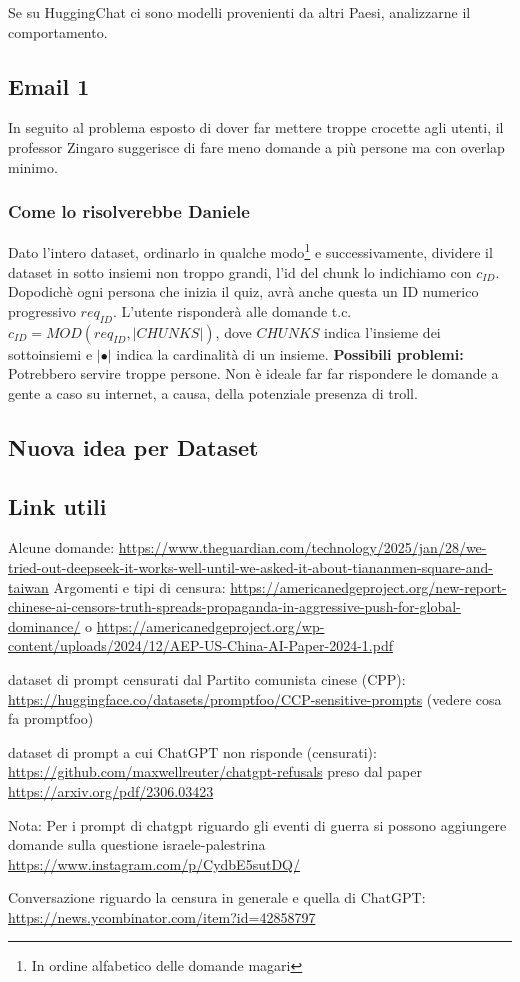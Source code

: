Se su HuggingChat ci sono modelli provenienti da altri Paesi, analizzarne il comportamento.

\subsection{Email 1}
In seguito al problema esposto di dover far mettere troppe crocette agli utenti, il professor Zingaro suggerisce di fare meno domande a più persone ma con overlap minimo.

\subsubsection{Come lo risolverebbe Daniele}
Dato l'intero dataset, ordinarlo in qualche modo\footnote{In ordine alfabetico delle domande magari} e successivamente, dividere il dataset in sotto insiemi non troppo grandi, l'id del chunk lo indichiamo con $c_{ID}$.
\newline
Dopodichè ogni persona che inizia il quiz, avrà anche questa un ID numerico progressivo $req_{ID}$.
\newline
L'utente risponderà alle domande t.c. $c_{ID} = MOD(req_{ID}, |CHUNKS|)$, dove $CHUNKS$ indica l'insieme dei sottoinsiemi e $|\bullet|$ indica la cardinalità di un insieme.
\newline
\textbf{Possibili problemi:} Potrebbero servire troppe persone. \newline Non è ideale far far rispondere le domande a gente a caso su internet, a causa, della potenziale presenza di troll.

\subsection{Nuova idea per Dataset}


\subsection{Link utili}
Alcune domande: \url{https://www.theguardian.com/technology/2025/jan/28/we-tried-out-deepseek-it-works-well-until-we-asked-it-about-tiananmen-square-and-taiwan} %
Argomenti e tipi di censura: \url{https://americanedgeproject.org/new-report-chinese-ai-censors-truth-spreads-propaganda-in-aggressive-push-for-global-dominance/} %
o 
\url{https://americanedgeproject.org/wp-content/uploads/2024/12/AEP-US-China-AI-Paper-2024-1.pdf} %

dataset di prompt censurati dal Partito comunista cinese (CPP): \url{https://huggingface.co/datasets/promptfoo/CCP-sensitive-prompts} (vedere cosa fa promptfoo)

dataset di prompt a cui ChatGPT non risponde (censurati): \url{https://github.com/maxwellreuter/chatgpt-refusals} preso dal paper \url{https://arxiv.org/pdf/2306.03423}

Nota: Per i prompt di chatgpt riguardo gli eventi di guerra si possono aggiungere domande sulla questione israele-palestrina \url{https://www.instagram.com/p/CydbE5sutDQ/}

Conversazione riguardo la censura in generale e quella di ChatGPT: \url{https://news.ycombinator.com/item?id=42858797}
